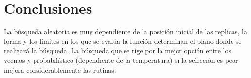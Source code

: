 \documentclass{article}
\begin{document}
\section{Conclusiones}
La búsqueda aleatoria es muy dependiente de la posición inicial de las replicas, la forma y los limites en los que se evalúa la función determinan el plano donde se realizará la búsqueda. La búsqueda que se rige por la mejor opción entre los vecinos y probabilístico (dependiente de la temperatura) si  la selección es peor mejora considerablemente las rutinas.


\end{document}
